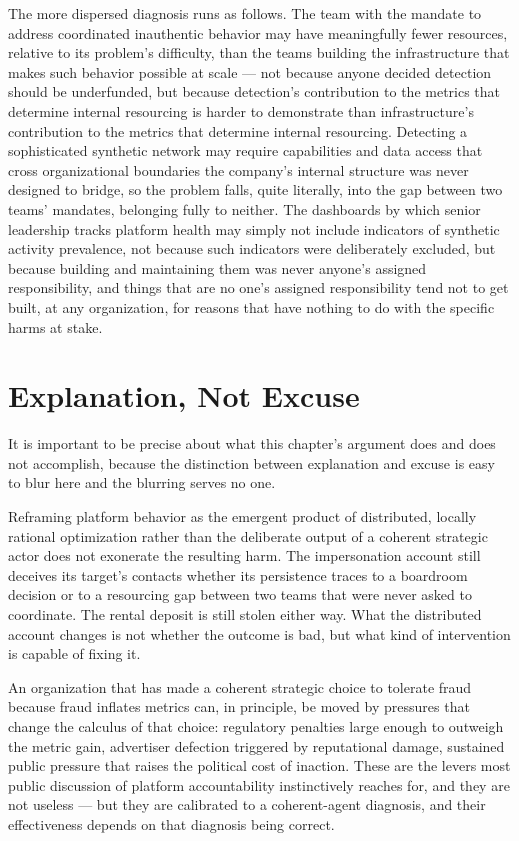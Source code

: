 \documentclass[12pt,a4paper]{book}
\begin{document}
The more dispersed diagnosis runs as follows. The team with the mandate to address coordinated inauthentic behavior may have meaningfully fewer resources, relative to its problem's difficulty, than the teams building the infrastructure that makes such behavior possible at scale — not because anyone decided detection should be underfunded, but because detection's contribution to the metrics that determine internal resourcing is harder to demonstrate than infrastructure's contribution to the metrics that determine internal resourcing. Detecting a sophisticated synthetic network may require capabilities and data access that cross organizational boundaries the company's internal structure was never designed to bridge, so the problem falls, quite literally, into the gap between two teams' mandates, belonging fully to neither. The dashboards by which senior leadership tracks platform health may simply not include indicators of synthetic activity prevalence, not because such indicators were deliberately excluded, but because building and maintaining them was never anyone's assigned responsibility, and things that are no one's assigned responsibility tend not to get built, at any organization, for reasons that have nothing to do with the specific harms at stake.

\section{Explanation, Not Excuse}

It is important to be precise about what this chapter's argument does and does not accomplish, because the distinction between explanation and excuse is easy to blur here and the blurring serves no one.

Reframing platform behavior as the emergent product of distributed, locally rational optimization rather than the deliberate output of a coherent strategic actor does not exonerate the resulting harm. The impersonation account still deceives its target's contacts whether its persistence traces to a boardroom decision or to a resourcing gap between two teams that were never asked to coordinate. The rental deposit is still stolen either way. What the distributed account changes is not whether the outcome is bad, but what kind of intervention is capable of fixing it.

An organization that has made a coherent strategic choice to tolerate fraud because fraud inflates metrics can, in principle, be moved by pressures that change the calculus of that choice: regulatory penalties large enough to outweigh the metric gain, advertiser defection triggered by reputational damage, sustained public pressure that raises the political cost of inaction. These are the levers most public discussion of platform accountability instinctively reaches for, and they are not useless — but they are calibrated to a coherent-agent diagnosis, and their effectiveness depends on that diagnosis being correct.
\end{document}
